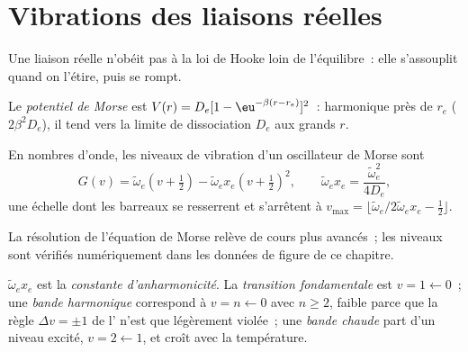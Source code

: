 \section{Vibrations des liaisons réelles}\label{sec:b3:rovibrational-spectroscopy:real-bonds}

Une liaison réelle n'obéit pas à la loi de Hooke loin de l'équilibre~:
elle s'assouplit quand on l'étire, puis se rompt.

\begin{definition}\label{def:b3:rovibrational-spectroscopy:morse}
Le \emph{potentiel de Morse} est $V(r) = D_e[1 -
\eu^{-\beta(r - r_e)}]^2$~: harmonique près de $r_e$ (
$2\beta^2D_e$), il tend vers la limite de dissociation $D_e$ aux grands
$r$.
\end{definition}

\begin{proposition}\label{prop:b3:rovibrational-spectroscopy:morse-levels}
En nombres d'onde, les niveaux de vibration d'un oscillateur de Morse sont
\[
G(v) = \tilde\omega_e(v + \tfrac12) - \tilde\omega_ex_e(v + \tfrac12)^2, \qquad
\tilde\omega_ex_e = \frac{\tilde\omega_e^2}{4D_e},
\]
une échelle dont les barreaux se resserrent et s'arrêtent à $v_{\max} = \lfloor\tilde\omega_e/
2\tilde\omega_ex_e - \frac12\rfloor$.
\end{proposition}
\admitted

La résolution de l'équation de Morse relève de cours plus avancés~; les
niveaux sont vérifiés numériquement dans les données de figure de ce
chapitre.

\begin{definition}\label{def:b3:rovibrational-spectroscopy:anharmonic}
$\tilde\omega_ex_e$ est la \emph{constante d'anharmonicité}.
La \emph{transition fondamentale}
est $v = 1 \leftarrow 0$~; une \emph{bande harmonique} correspond à $v = n \leftarrow 0$
avec $n \ge 2$, faible parce que la règle $\Delta v = \pm1$ de
l' n'est que légèrement violée~; une \emph{bande
chaude} part d'un niveau excité, $v = 2 \leftarrow 1$,
et croît avec la température.
\end{definition}

